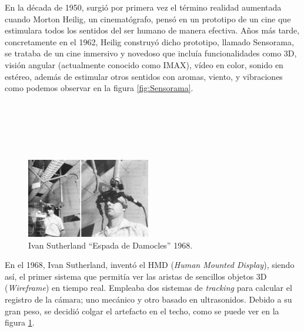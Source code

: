 En la década de 1950, surgió por primera vez el término realidad aumentada cuando Morton Heilig, un cinematógrafo, pensó en un prototipo de un cine que estimulara todos los sentidos del ser humano de manera efectiva. Años más tarde, concretamente en el 1962, Heilig construyó dicho prototipo, llamado Sensorama, se trataba de un cine inmersivo y novedoso que incluía funcionalidades como 3D, visión angular (actualmente conocido como IMAX), vídeo en color, sonido en estéreo, además de estimular otros sentidos con aromas, viento, y vibraciones como podemos observar en la figura \ref{fig:Sensorama}.\\
\\
\\
\\
\\
\\

\begin{figure}
    \centering
    \includegraphics[width=0.48\textwidth]{Images/HumanMountDisplay.png}
    \caption{Ivan Sutherland “Espada de Damocles” 1968.}
    \label{fig:EspadaDamocles}
\end{figure}

En el 1968, Ivan Sutherland, inventó el HMD (\textit{Human Mounted Display}), siendo así, el primer sistema que permitía ver las aristas de sencillos objetos 3D (\textit{Wireframe}) en tiempo real. Empleaba dos sistemas de \textit{tracking} para calcular el registro de la cámara; uno mecánico y otro basado en ultrasonidos. Debido a su gran peso, se decidió colgar el artefacto en el techo, como se puede ver en la figura \ref{fig:EspadaDamocles}.
\\
\\
\\
\\
\\
\\


